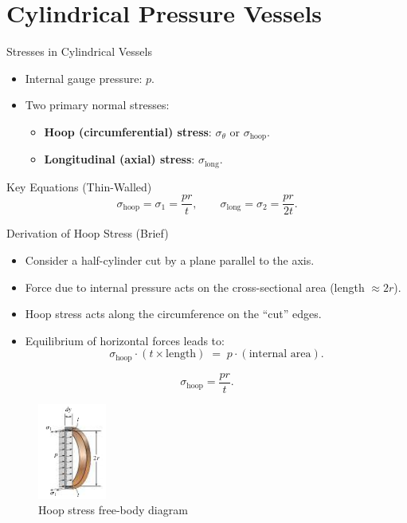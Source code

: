 \documentclass[aspectratio=169]{beamer}
\begin{document}
\section{Cylindrical Pressure Vessels}

\begin{frame}{Stresses in Cylindrical Vessels}
  \begin{itemize}
    \item Internal gauge pressure: $p$.
    \item Two primary normal stresses:
      \begin{itemize}
        \item \textbf{Hoop (circumferential) stress}: $\sigma_{\theta}$ or $\sigma_{\text{hoop}}$.
        \item \textbf{Longitudinal (axial) stress}: $\sigma_{\text{long}}$.
      \end{itemize}
  \end{itemize}
  \vfill
  \begin{block}{Key Equations (Thin-Walled)}
    \[
      \sigma_{\text{hoop}} = \sigma_1 = \frac{p r}{t}, 
      \qquad
      \sigma_{\text{long}} = \sigma_2 = \frac{p r}{2t}.
    \]
  \end{block}
\end{frame}

\begin{frame}{Derivation of Hoop Stress (Brief)}
  \begin{itemize}
    \item Consider a half-cylinder cut by a plane parallel to the axis.
    \item Force due to internal pressure acts on the cross-sectional area (length $\approx 2r$).
    \item Hoop stress acts along the circumference on the “cut” edges.
    \item Equilibrium of horizontal forces leads to:
    \[
      \sigma_{\text{hoop}} \cdot (t \times \text{length}) 
      \;=\; p \cdot (\text{internal area}).
    \]
  \end{itemize}
  \[
    \sigma_{\text{hoop}} = \frac{p r}{t}.
  \]
  \begin{figure}
    \centering
    \includegraphics[width=0.2\textwidth]{hoop.png} %
    \caption{Hoop stress free-body diagram}
  \end{figure}
\end{frame}
\end{document}

